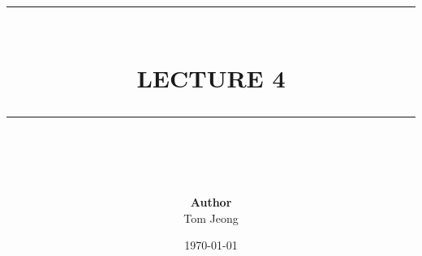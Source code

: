 \documentclass{article}
\newcommand{\HRule}[1]{\rule{\linewidth}{#1}}
\begin{document}

\title{ \normalsize \textsc{}
		\\ [2.0cm]
		\HRule{1.5pt} \\
		\LARGE \textbf{\uppercase{Lecture 4}}
		\HRule{2.0pt} \\ [0.6cm] \LARGE{}
		}

\date{\today}
\author{\textbf{Author} \\ 
		Tom Jeong
        }

\maketitle

\tableofcontents
\newpage

\end{document}
